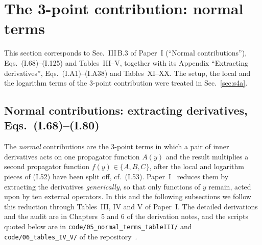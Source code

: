 \documentclass[aps,prd,onecolumn,10pt,nofootinbib,floatfix]{revtex4-2}
\newcommand{\PI}{Paper~I}
\newcommand{\eqI}[1]{(I.#1)}
\begin{document}
\providecommand{\sivbdd}{\nabla\!\cdot\!\nabla'}
\providecommand{\sivbAl}{A_{\rm lead}}
\providecommand{\sivbAh}{\hat A}
\providecommand{\sivbO}{O}
\providecommand{\sivbF}{\mathcal{F}}

\section{The 3-point contribution: normal terms}
\label{sec:s4b}

This section corresponds to Sec.~III\,B.3 of \PI{} (``Normal contributions''), Eqs.~\eqI{68}--\eqI{125} and Tables~III--V,
together with its Appendix ``Extracting derivatives'', Eqs.~\eqI{A1}--\eqI{A38} and Tables~XI--XX. The setup, the local and the
logarithm terms of the 3-point contribution were treated in Sec.~\ref{sec:s4a}.

\subsection{Normal contributions: extracting derivatives, Eqs.~(I.68)--(I.80)}
\label{sec:s4b:extract}

The \emph{normal} contributions are the 3-point terms in which a pair of inner derivatives acts on one
propagator function $A(y)$ and the result multiplies a second propagator function $f(y)\in\{A,B,C\}$, after the
local and logarithm pieces of \eqI{52} have been split off, cf.\ \eqI{53}. \PI~\cite{KW07} reduces them by
extracting the derivatives \emph{generically}, so that only functions of $y$ remain, acted upon by ten
external operators. In this and the following subsections we follow this reduction through Tables~III, IV and V
of \PI\@. The detailed derivations and the audit are in Chapters~5 and 6 of the derivation notes, and the scripts quoted below are
in \texttt{code/05\_normal\_terms\_tableIII/} and \texttt{code/06\_tables\_IV\_V/} of the
repository~\cite{ref:repo}.
\end{document}
